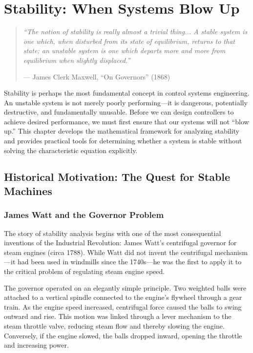 
\chapter{Stability: When Systems Blow Up}
\label{ch:stability}

\begin{quote}
\textit{``The notion of stability is really almost a trivial thing... A stable system is one which, when disturbed from its state of equilibrium, returns to that state; an unstable system is one which departs more and more from equilibrium when slightly displaced.''}

\hfill --- James Clerk Maxwell, ``On Governors'' (1868)
\end{quote}

\vspace{1em}

\noindent
Stability is perhaps the most fundamental concept in control systems engineering. An unstable system is not merely poorly performing---it is dangerous, potentially destructive, and fundamentally unusable. Before we can design controllers to achieve desired performance, we must first ensure that our systems will not ``blow up.'' This chapter develops the mathematical framework for analyzing stability and provides practical tools for determining whether a system is stable without solving the characteristic equation explicitly.

\section{Historical Motivation: The Quest for Stable Machines}
\label{sec:stability_history}

\subsection{James Watt and the Governor Problem}

The story of stability analysis begins with one of the most consequential inventions of the Industrial Revolution: James Watt's centrifugal governor for steam engines (circa 1788). While Watt did not invent the centrifugal mechanism---it had been used in windmills since the 1740s---he was the first to apply it to the critical problem of regulating steam engine speed.

The governor operated on an elegantly simple principle. Two weighted balls were attached to a vertical spindle connected to the engine's flywheel through a gear train. As the engine speed increased, centrifugal force caused the balls to swing outward and rise. This motion was linked through a lever mechanism to the steam throttle valve, reducing steam flow and thereby slowing the engine. Conversely, if the engine slowed, the balls dropped inward, opening the throttle and increasing power.

